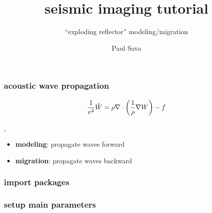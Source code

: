 


\title[]{seismic imaging tutorial}
\subtitle{``exploding reflector'' modeling/migration}
\author[]{Paul Sava}
\date{}
\logo{}
\large

\def\big#1{\begin{center} \LARGE \textbf{#1} \end{center}}
\def\cen#1{\begin{center}        \textbf{#1} \end{center}}

 { \cwpcover }


\begin{frame} \frametitle{acoustic wave propagation}

\[
\frac{1}{v^2} \ddot{W} = 
\rho \nabla \cdot {\left (\frac{1}{\rho} \nabla {W} \right)} -f
\]

\sep

\begin{itemize}
   \item \textbf{modeling}: propagate waves forward
   \item \textbf{migration}: propagate waves backward 
\end{itemize}

\end{frame}
\cwpnote{}

\begin{frame} \frametitle{import packages}
  \normalsize
  \blueshade{
    
  }
\end{frame}
\cwpnote{}

\begin{frame} \frametitle{setup main parameters}
  \normalsize
  \blueshade{
    
  }
\end{frame}
\cwpnote{}

